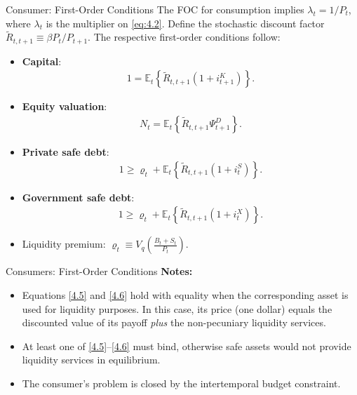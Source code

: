 \documentclass[11pt,aspectratio=169]{beamer}
\newcommand{\E}{\mathbb{E}}
\begin{document}
\begin{frame}{Consumer: First-Order Conditions}
\small
The FOC for consumption implies $\lambda_t = 1/P_t$, where $\lambda_t$ is the multiplier on \eqref{eq:4.2}.  
Define the stochastic discount factor $\tilde{R}_{t,t+1} \equiv \beta P_t / P_{t+1}$. The respective first-order conditions follow:

\begin{itemize}

\item \textbf{Capital}:
\begin{align}
1 = \E_t\!\left\{\tilde{R}_{t,t+1}(1+i_{t+1}^K)\right\}.
\label{4.3}
\end{align}

\item \textbf{Equity valuation}:
\begin{align}
N_t = \E_t\!\left\{\tilde{R}_{t,t+1}\Psi_{t+1}^D\right\}.
\label{4.4}
\end{align}

\item \textbf{Private safe debt}:
\begin{align}
1 \ge \varrho_t + \E_t\!\left\{\tilde{R}_{t,t+1}(1+i_t^S)\right\}.
\label{4.5}
\end{align}

\item \textbf{Government safe debt}:
\begin{align}
1 \ge \varrho_t + \E_t\!\left\{\tilde{R}_{t,t+1}(1+i_t^X)\right\}.
\label{4.6}
\end{align}

\item Liquidity premium:  
$\displaystyle \varrho_t \equiv V_q\!\left(\tfrac{B_t + S_t}{P_t}\right)$.

\end{itemize}
\end{frame}

\begin{frame}{Consumers: First-Order Conditions}
\small
\textbf{Notes:}
\begin{itemize}
\item Equations \eqref{4.5} and \eqref{4.6} hold with equality when the corresponding asset is used for liquidity purposes.  
In this case, its price (one dollar) equals the discounted value of its payoff \emph{plus} the non-pecuniary liquidity services.
\vspace{1em}
\item At least one of \eqref{4.5}--\eqref{4.6} must bind, otherwise safe assets would not provide liquidity services in equilibrium.
\vspace{1em}
\item The consumer’s problem is closed by the intertemporal budget constraint.
\end{itemize}
\end{frame}
\end{document}
